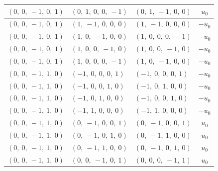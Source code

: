 \documentclass[11pt]{article}
\theoremstyle{definition}
\begin{document}
\begin{longtable}{|l|l|l|c|}
    \hline
    $\left( 0, \  0, \  -1, \  0, \  1\right)$ & $\left( 0, \  1, \  0, \  0, \  -1\right)$ & $\left( 0, \  1, \  -1, \  0, \  0\right)$ & $u_{0}$ \\
    \hline
    $\left( 0, \  0, \  -1, \  0, \  1\right)$ & $\left( 1, \  -1, \  0, \  0, \  0\right)$ & $\left( 1, \  -1, \  0, \  0, \  0\right)$ & $- u_{0}$ \\
    \hline
    $\left( 0, \  0, \  -1, \  0, \  1\right)$ & $\left( 1, \  0, \  -1, \  0, \  0\right)$ & $\left( 1, \  0, \  0, \  0, \  -1\right)$ & $- u_{0}$ \\
    \hline
    $\left( 0, \  0, \  -1, \  0, \  1\right)$ & $\left( 1, \  0, \  0, \  -1, \  0\right)$ & $\left( 1, \  0, \  0, \  -1, \  0\right)$ & $- u_{0}$ \\
    \hline
    $\left( 0, \  0, \  -1, \  0, \  1\right)$ & $\left( 1, \  0, \  0, \  0, \  -1\right)$ & $\left( 1, \  0, \  -1, \  0, \  0\right)$ & $- u_{0}$ \\
    \hline
    $\left( 0, \  0, \  -1, \  1, \  0\right)$ & $\left( -1, \  0, \  0, \  0, \  1\right)$ & $\left( -1, \  0, \  0, \  0, \  1\right)$ & $- u_{0}$ \\
    \hline
    $\left( 0, \  0, \  -1, \  1, \  0\right)$ & $\left( -1, \  0, \  0, \  1, \  0\right)$ & $\left( -1, \  0, \  1, \  0, \  0\right)$ & $- u_{0}$ \\
    \hline
    $\left( 0, \  0, \  -1, \  1, \  0\right)$ & $\left( -1, \  0, \  1, \  0, \  0\right)$ & $\left( -1, \  0, \  0, \  1, \  0\right)$ & $- u_{0}$ \\
    \hline
    $\left( 0, \  0, \  -1, \  1, \  0\right)$ & $\left( -1, \  1, \  0, \  0, \  0\right)$ & $\left( -1, \  1, \  0, \  0, \  0\right)$ & $- u_{0}$ \\
    \hline
    $\left( 0, \  0, \  -1, \  1, \  0\right)$ & $\left( 0, \  -1, \  0, \  0, \  1\right)$ & $\left( 0, \  -1, \  0, \  0, \  1\right)$ & $u_{0}$ \\
    \hline
    $\left( 0, \  0, \  -1, \  1, \  0\right)$ & $\left( 0, \  -1, \  0, \  1, \  0\right)$ & $\left( 0, \  -1, \  1, \  0, \  0\right)$ & $u_{0}$ \\
    \hline
    $\left( 0, \  0, \  -1, \  1, \  0\right)$ & $\left( 0, \  -1, \  1, \  0, \  0\right)$ & $\left( 0, \  -1, \  0, \  1, \  0\right)$ & $u_{0}$ \\
    \hline
    $\left( 0, \  0, \  -1, \  1, \  0\right)$ & $\left( 0, \  0, \  -1, \  0, \  1\right)$ & $\left( 0, \  0, \  0, \  -1, \  1\right)$ & $u_{0}$ \\

\end{longtable}
\end{document}
